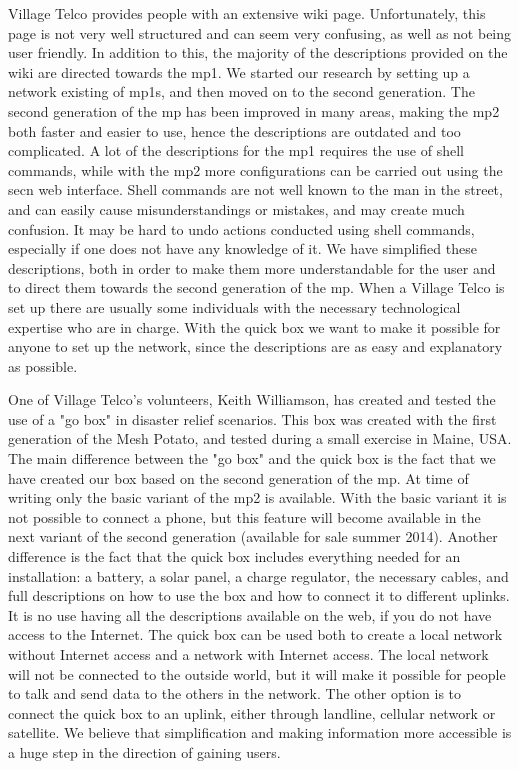 Village Telco provides people with an extensive wiki page. Unfortunately, this page is not very well structured and can seem very confusing, as well as not being user friendly. In addition to this, the majority of the descriptions provided on the wiki are directed towards the \gls{mp1}. We started our research by setting up a network existing of \glspl{mp1}, and then moved on to the second generation. The second generation of the \gls{mp} has been improved in many areas, making the \gls{mp2} both faster and easier to use, hence the descriptions are outdated and too complicated. A lot of the descriptions for the \gls{mp1} requires the use of shell commands, while with the \gls{mp2} more configurations can be carried out using the \gls{secn} web interface. Shell commands are not well known to the man in the street, and can easily cause misunderstandings or mistakes, and may create much confusion. It may be hard to undo actions conducted using shell commands, especially if one does not have any knowledge of it. We have simplified these descriptions, both in order to make them more understandable for the user and to direct them towards the second generation of the \gls{mp}. When a Village Telco is set up there are usually some individuals with the necessary technological expertise who are in charge. With the \gls{quick} box we want to make it possible for anyone to set up the network, since the descriptions are as easy and explanatory as possible. 

One of Village Telco's volunteers, Keith Williamson, has created and tested the use of a "go box" in disaster relief scenarios. This box was created with the first generation of the Mesh Potato, and tested during a small exercise in Maine, USA. The main difference between the "go box" and the \gls{quick} box is the fact that we have created our box based on the second generation of the \gls{mp}. At time of writing only the basic variant of the \gls{mp2} is available. With the basic variant it is not possible to connect a phone, but this feature will become available in the next variant of the second generation (available for sale summer 2014). Another difference is the fact that the \gls{quick} box includes everything needed for an installation: a battery, a solar panel, a charge regulator, the necessary cables, and full descriptions on how to use the box and how to connect it to different uplinks. It is no use having all the descriptions available on the web, if you do not have access to the Internet. The \gls{quick} box can be used both to create a local network without Internet access and a network with Internet access. The local network will not be connected to the outside world, but it will make it possible for people to talk and send data to the others in the network. The other option is to connect the \gls{quick} box to an uplink, either through landline, cellular network or satellite. We believe that simplification and making information more accessible is a huge step in the direction of gaining users. 

